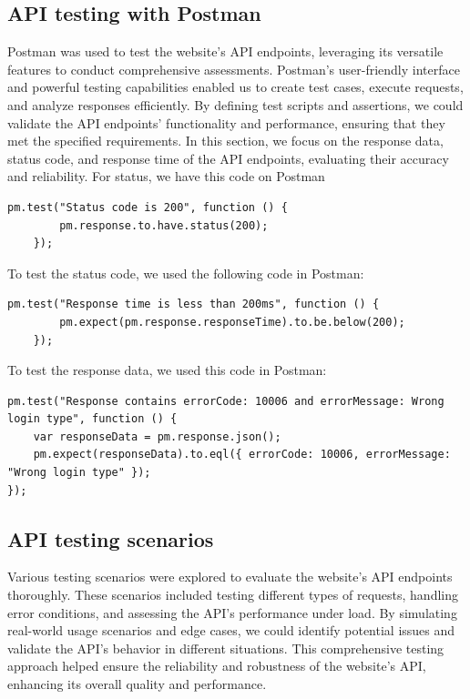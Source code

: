 \subsection{API testing with Postman}
Postman was used to test the website's API endpoints, leveraging its
versatile features to conduct comprehensive assessments. Postman's
user-friendly interface and powerful testing capabilities enabled us to
create test cases, execute requests, and analyze responses efficiently.
By defining test scripts and assertions, we could validate the API
endpoints' functionality and performance, ensuring that they met the
specified requirements.
In this section, we focus on the response data, status code, and response
time of the API endpoints, evaluating their accuracy and reliability.
For status, we have this code on Postman
\begin{lstlisting}[caption=Code to test status code, label={lst:status-code}]
    pm.test("Status code is 200", function () {
        pm.response.to.have.status(200);
    });
\end{lstlisting}
To test the status code, we used the following code in Postman:
\begin{lstlisting}[caption=Code to test response time, label={lst:response-time}]
    pm.test("Response time is less than 200ms", function () {
        pm.expect(pm.response.responseTime).to.be.below(200);
    });
\end{lstlisting}
To test the response data, we used this code in Postman:
\begin{lstlisting}[caption=Code to test response data, label={lst:response-data}]
    pm.test("Response contains errorCode: 10006 and errorMessage: Wrong login type", function () {
    var responseData = pm.response.json();
    pm.expect(responseData).to.eql({ errorCode: 10006, errorMessage: "Wrong login type" });
});
\end{lstlisting}

\subsection{API testing scenarios}
Various testing scenarios were explored to evaluate the website's API
endpoints thoroughly. These scenarios included testing different types of
requests, handling error conditions, and assessing the API's performance
under load. By simulating real-world usage scenarios and edge cases, we
could identify potential issues and validate the API's behavior in
different situations. This comprehensive testing approach helped ensure
the reliability and robustness of the website's API, enhancing its overall
quality and performance. 

